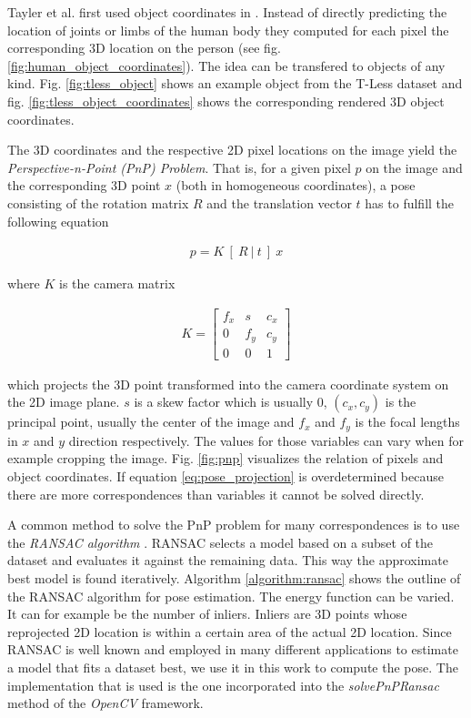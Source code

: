 Tayler et al. first used object coordinates in \cite{tsharp}. Instead of directly predicting the location of joints or limbs of the human body they computed for each pixel the corresponding 3D location on the person (see fig. \ref{fig:human_object_coordinates}). The idea can be transfered to objects of any kind. Fig. \ref{fig:tless_object} shows an example object from the T-Less dataset \cite{tless} and fig. \ref{fig:tless_object_coordinates} shows the corresponding rendered 3D object coordinates.

The 3D coordinates and the respective 2D pixel locations on the image yield the \textit{Perspective-n-Point (PnP) Problem}. That is, for a given pixel $p$ on the image and the corresponding 3D point $x$ (both in homogeneous coordinates), a pose consisting of the rotation matrix $R$ and the translation vector $t$ has to fulfill the following equation

\begin{align}
 p = K \ [ \ R \ | \ t \ ] \ x \label{eq:pose_projection}
\end{align} 

where $K$ is the camera matrix

\begin{align}
K = \begin{bmatrix}
f_x & s & c_x \\
0 & f_y & c_y \\
0 & 0 & 1 
\end{bmatrix}
\end{align}

which projects the 3D point transformed into the camera coordinate system on the 2D image plane. $s$ is a skew factor which is usually $0$, $(c_x, c_y)$ is the principal point, usually the center of the image and $f_x$ and $f_y$ is the focal lengths in $x$ and $y$ direction respectively. The values for those variables can vary when for example cropping the image. Fig. \ref{fig:pnp} visualizes the relation of pixels and object coordinates. If equation \ref{eq:pose_projection} is overdetermined because there are more correspondences than variables it cannot be solved directly.

A common method to solve the PnP problem for many correspondences is to use the \textit{RANSAC algorithm} \cite{ransac}. RANSAC selects a model based on a subset of the dataset and evaluates it against the remaining data. This way the approximate best model is found iteratively. Algorithm \ref{algorithm:ransac} shows the outline of the RANSAC algorithm for pose estimation. The energy function can be varied. It can for example be the number of inliers. Inliers are 3D points whose reprojected 2D location is within a certain area of the actual 2D location. Since RANSAC is well known and employed in many different applications to estimate a model that fits a dataset best, we use it in this work to compute the pose. The implementation that is used is the one incorporated into the \textit{solvePnPRansac} method of the \textit{OpenCV} \cite{opencv} framework. 


